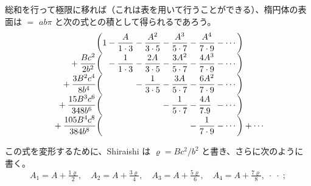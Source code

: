 \documentclass[11pt]{article}
\begin{document}
総和を行って極限に移れば（これは表を用いて行うことができる）、楕円体の表面は $=$ $ab\pi$ と次の式との積として得られるであろう。
\[
\begin{array}{r@{}l@{}l@{}l@{}l@{}l@{}l}
\biggl( & 1 & {}-\dfrac{A}{1\cdot 3} & {}-\dfrac{A^2}{3\cdot 5} & {}-\dfrac{A^3}{5\cdot 7} & {}-\dfrac{A^4}{7\cdot 9} & {}-\cdots\biggr)\\[2mm]
{}+\dfrac{Bc^2}{2b^2}\biggl( & & {}-\dfrac{1}{1\cdot 3} & {}-\dfrac{2A}{3\cdot 5} & {}-\dfrac{3A^2}{5\cdot 7} & {}-\dfrac{4A^3}{7\cdot 9} & {}-\cdots\biggr)\\[2mm]
{}+\dfrac{3B^2c^4}{8b^4}\biggl( & & & {}-\dfrac{1}{3\cdot 5} & {}-\dfrac{3A}{5\cdot 7} & {}-\dfrac{6A^2}{7\cdot 9} & {}-\cdots\biggr)\\[2mm]
{}+\dfrac{15B^3c^6}{348b^6}\biggl( & & & & {}-\dfrac{1}{5\cdot 7} & {}-\dfrac{4A}{7.9} & {}-\cdots\biggr)\\[2mm]
{}+\dfrac{105B^4c^8}{384b^8}\biggl( & & & & & {}-\dfrac{1}{7\cdot 9} & {}-\cdots\biggr)+\cdots
\end{array}
\]

この式を変形するために、Shiraishi は $\varrho=Bc^2/b^2$ と書き、さらに次のように書く。
\[
A_1=A+\tfrac{1\varrho}{2},\quad A_2=A+\tfrac{3\varrho}{4},\quad A_3=A+\tfrac{5\varrho}{6},\quad A_4=A+\tfrac{7\varrho}{8},\;\cdot\;\cdot\;;
\]
\end{document}
